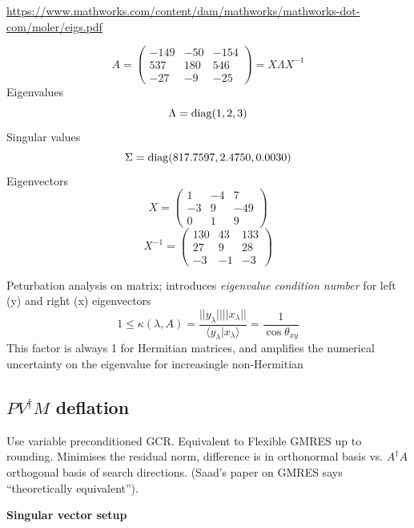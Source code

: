 \documentclass[letter,10pt]{report}
\begin{document}
\href{https://www.mathworks.com/content/dam/mathworks/mathworks-dot-com/moler/eigs.pdf}{https://www.mathworks.com/content/dam/mathworks/mathworks-dot-com/moler/eigs.pdf}

$$
A = \left( \begin{array}{ccc}
 -149 & -50 & -154 \\
 537  & 180 & 546 \\
 -27  & -9  & -25
\end{array}
\right) =  X \Lambda X^{-1}
$$
Eigenvalues
$$
\Lambda ={\rm diag}(1,2,3)
$$
Singular values
$$
\Sigma = {\rm diag}(817.7597,2.4750,0.0030)
$$
Eigenvectors
$$
X = \left( \begin{array}{ccc}
 1  & -4 & 7 \\
-3  & 9 & -49 \\
 0  & 1  & 9
\end{array}
\right)
$$
$$
X^{-1} = \left( \begin{array}{ccc}
 130  & 43 & 133 \\
 27  & 9 & 28  \\
 -3  &-1  & -3
\end{array}
\right)
$$

Peturbation analysis on matrix; introduces \emph{eigenvalue condition number} for left (y) and right (x) eigenvectors
$$
1\le \kappa(\lambda,A) = \frac{||y_\lambda|| ||x_\lambda||}{ \langle y_\lambda|x_\lambda \rangle} = \frac{1}{\cos \theta_{xy}}
$$
This factor is always 1 for Hermitian matrices, and amplifies the numerical uncertainty on the eigenvalue for increasingle non-Hermitian


\subsection{$PV^\dagger M$ deflation}


Use variable preconditioned GCR. Equivalent to Flexible GMRES up to rounding.
Minimises the residual norm, difference is in orthonormal basis vs. $A^\dag A$ orthogonal basis of search directions.
(Saad's paper on GMRES says ``theoretically equivalent'').

{\bf Singular vector setup }
\end{document}
